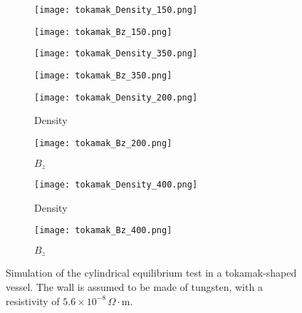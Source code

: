 \begin{figure}[htbp]
	\vspace{-6mm} %
	
	\hspace{-6mm}
	\begin{subfigure}{0.26\textwidth}
		\texttt{[image: tokamak\_Density\_150.png]}
	\end{subfigure}
	\hspace{-4mm} %
	\begin{subfigure}{0.26\textwidth}
		\texttt{[image: tokamak\_Bz\_150.png]}
	\end{subfigure}
	\hspace{2mm} %
	\begin{subfigure}{0.26\textwidth}
		\texttt{[image: tokamak\_Density\_350.png]}
	\end{subfigure}
	\hspace{-4mm} %
	\begin{subfigure}{0.26\textwidth}
		\texttt{[image: tokamak\_Bz\_350.png]}
	\end{subfigure}
	\hspace{-6mm}
	
	\vspace{-6mm} %
	
	\hspace{-6mm}
	\begin{subfigure}{0.26\textwidth}
		\texttt{[image: tokamak\_Density\_200.png]}
		\caption*{Density}
	\end{subfigure}
	\hspace{-4mm} %
	\begin{subfigure}{0.26\textwidth}
		\texttt{[image: tokamak\_Bz\_200.png]}
		\caption*{$B_z$}
	\end{subfigure}
	\hspace{2mm} %
	\begin{subfigure}{0.26\textwidth}
		\texttt{[image: tokamak\_Density\_400.png]}
		\caption*{Density}
	\end{subfigure}
	\hspace{-4mm} %
	\begin{subfigure}{0.26\textwidth}
		\texttt{[image: tokamak\_Bz\_400.png]}
		\caption*{$B_z$}
	\end{subfigure}
	\hspace{-6mm}
	
	\vspace{1mm} %
	
	\caption[Tokamak Application]{Simulation of the cylindrical equilibrium test in a tokamak-shaped vessel. The wall is assumed to be made of tungsten, with a resistivity of $5.6 \times 10^{-8} \, \Omega \cdot \text{m}$.}
	\label{fig:tokamak_application_inchapter9}
\end{figure}


  
